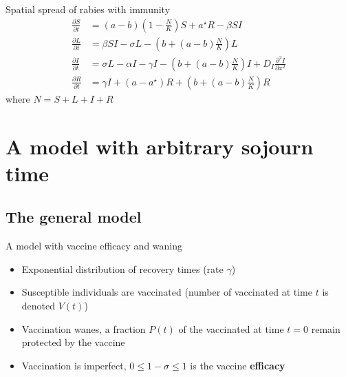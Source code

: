 \documentclass[aspectratio=169]{beamer}\usepackage[]{graphicx}\usepackage[]{xcolor}
\begin{document}
\nocite{murray1992spatial}

\begin{frame}{Spatial spread of rabies with immunity}
\begin{subequations}
\label{sys:rabies}
\begin{align}
\frac{\partial S}{\partial t} &= 
(a-b)\left(1-\frac NK\right)S+a^\star R-\beta SI \label{sys:rabies_S} \\
\frac{\partial L}{\partial t} &= 
\beta SI-\sigma L-\left(b+(a-b)\frac NK\right)L \label{sys:rabies_L} \\
\frac{\partial I}{\partial t} &= 
\sigma L-\alpha I-\gamma I-\left(b+(a-b)\frac NK\right)I 
+ D_I\frac{\partial^2 I}{\partial x^2} \label{sys:rabies_I} \\
\frac{\partial R}{\partial t} &= 
\gamma I+(a-a^\star)R+\left(b+(a-b)\frac NK\right)R \label{sys:rabies_R}
\end{align}
\end{subequations}
where $N=S+L+I+R$
\end{frame}

\section{A model with arbitrary sojourn time}

\subsection{The general model}

\nocite{ArinoCookeVdDVelasco2004}

\begin{frame}{A model with vaccine efficacy and waning}
\begin{itemize}
\item Exponential distribution of recovery times (rate $\gamma$)
\vfill
\item Susceptible individuals are vaccinated (number of vaccinated at time $t$ is denoted $V(t)$)
\vfill
\item Vaccination wanes, a fraction $P(t)$ of the vaccinated at time $t=0$ remain protected by the vaccine
\vfill
\item Vaccination is imperfect, $0\leq 1-\sigma\leq 1$ is the vaccine \textbf{efficacy}
\end{itemize}
\end{frame}
\end{document}
